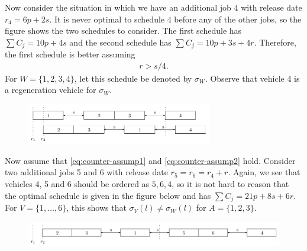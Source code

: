 \documentclass{article}
\theoremstyle{definition}
\theoremstyle{plain}
\begin{document}
Now consider the situation in which we have an additional job $4$ with release
date $r_{4} = 6p + 2s$. It is never optimal to schedule $4$ before any of the
other jobs, so the figure shows the two schedules to consider.
The first schedule has $\sum C_{j} = 10p + 4s$ and the second schedule has
$\sum C_{j} = 10p + 3s + 4r$. Therefore, the first schedule is better assuming
\begin{align}
  \label{eq:counter-assump2}
  r > s/4 .
\end{align}
For $W = \{1, 2, 3, 4\}$, let this schedule be denoted by $\sigma_{W}$.
Observe that vehicle 4 is a regeneration vehicle for $\sigma_{W}$.

\begin{figure}[h]
  \centering
  \includegraphics[width=0.72\textwidth]{figures/1234.pdf}
\end{figure}

Now assume that \eqref{eq:counter-assump1} and \eqref{eq:counter-assump2} hold.
Consider two additional jobs 5 and 6 with release date
$r_{5} = r_{6} = r_{4} + r$. Again, we see that vehicles 4, 5 and 6 should be
ordered as $5,6,4$, so it is not hard to reason that the optimal schedule is
given in the figure below and has $\sum C_{j} = 21p + 8s + 6r$. For
$V = \{ 1, \dots, 6\}$, this shows that $\sigma_{V}(l) \neq \sigma_{W}(l)$ for
$A=\{1, 2, 3 \}$.

\begin{figure}[h]
  \centering
  \includegraphics[width=1.0\textwidth]{figures/12345.pdf}
\end{figure}




\end{document}
